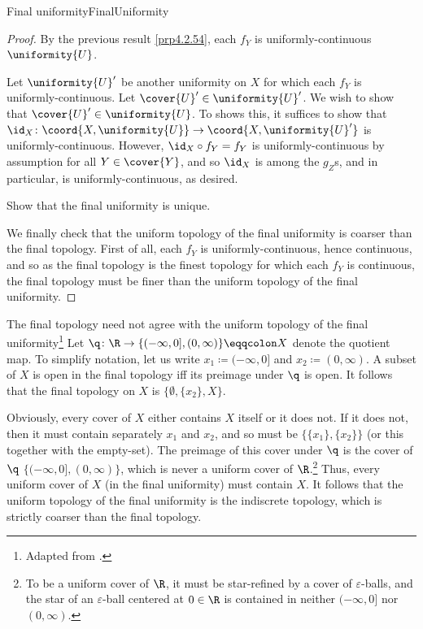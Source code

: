 \begin{prp}{Final uniformity}{FinalUniformity}
\begin{proof}
By the previous result \cref{prp4.2.54}, each $f_Y$ is uniformly-continuous $\uniformity{U}$.

Let $\uniformity{U}'$ be another uniformity on $X$ for which each $f_Y$ is uniformly-continuous.  Let $\cover{U}'\in \uniformity{U}'$.  We wish to show that $\cover{U}'\in \uniformity{U}$.  To shows this, it suffices to show that $\id _X\colon \coord{X,\uniformity{U}}\rightarrow \coord{X,\uniformity{U}'}$ is uniformly-continuous.  However, $\id _X\circ f_Y=f_Y$ is uniformly-continuous by assumption for all $Y\in \cover{Y}$, and so $\id _X$ is among the $g_Z$s, and in particular, is uniformly-continuous, as desired.
\begin{exr}[breakable=false]{}{}
Show that the final uniformity is unique.
\end{exr}

We finally check that the uniform topology of the final uniformity is coarser than the final topology.  First of all, each $f_Y$ is uniformly-continuous, hence continuous, and so as the final topology is the finest topology for which each $f_Y$ is continuous, the final topology must be finer than the uniform topology of the final uniformity.
\end{proof}
\end{prp}
\begin{exm}{The final topology need not agree with the uniform topology of the final uniformity}{}\footnote{Adapted from \cite[Exercise 2.1.10]{Kunzi}.}
Let $\q \colon \R \rightarrow \{ (-\infty ,0],(0,\infty )\}\eqqcolon X$ denote the quotient map.  To simplify notation, let us write $x_1\coloneqq (-\infty ,0]$ and $x_2\coloneqq (0,\infty )$.  A subset of $X$ is open in the final topology iff its preimage under $\q$ is open.  It follows that the final topology on $X$ is $\{ \emptyset ,\{ x_2\} ,X\}$.

Obviously, every cover of $X$ either contains $X$ itself or it does not.  If it does not, then it must contain separately $x_1$ and $x_2$, and so must be $\{ \{ x_1\} ,\{ x_2\} \}$ (or this together with the empty-set).  The preimage of this cover under $\q$ is the cover of $\q$ $\{ (-\infty ,0],(0,\infty )\}$, which is never a uniform cover of $\R$.\footnote{To be a uniform cover of $\R$, it must be star-refined by a cover of $\varepsilon$-balls, and the star of an $\varepsilon$-ball centered at $0\in \R$ is contained in neither $(-\infty ,0]$ nor $(0,\infty )$.}  Thus, every uniform cover of $X$ (in the final uniformity) must contain $X$.  It follows that the uniform topology of the final uniformity is the indiscrete topology, which is strictly coarser than the final topology.
\end{exm}

